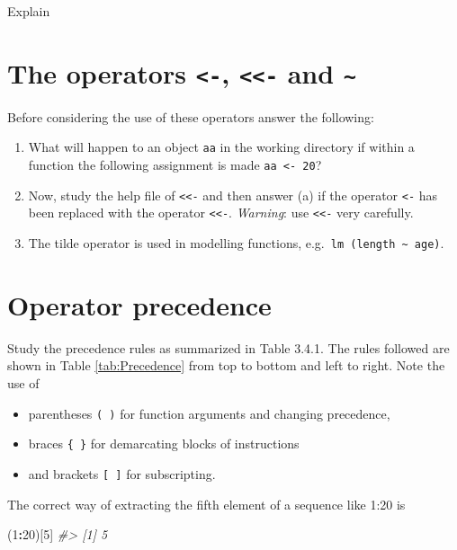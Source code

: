 \documentclass[
]{book}
\newenvironment{Shaded}{\begin{snugshade}}{\end{snugshade}}
\newcommand{\CommentTok}[1]{\textcolor[rgb]{0.56,0.35,0.01}{\textit{#1}}}
\newcommand{\DecValTok}[1]{\textcolor[rgb]{0.00,0.00,0.81}{#1}}
\newcommand{\NormalTok}[1]{#1}
\newcommand{\SpecialCharTok}[1]{\textcolor[rgb]{0.81,0.36,0.00}{\textbf{#1}}}
\providecommand{\tightlist}{%
  \setlength{\itemsep}{0pt}\setlength{\parskip}{0pt}}
\begin{document}
Explain

\section{\texorpdfstring{The operators \texttt{\textless{}-}, \texttt{\textless{}\textless{}-} and \texttt{\textasciitilde{}}}{The operators \textless-, \textless\textless- and \textasciitilde{}}}\label{the-operators-----and}

Before considering the use of these operators answer the following:

\begin{enumerate}
\def\labelenumi{(\alph{enumi})}
\item
  What will happen to an object \texttt{aa} in the working directory if within a function the following assignment is made \texttt{aa\ \textless{}-\ 20}?
\item
  Now, study the help file of \texttt{\textless{}\textless{}-} and then answer (a) if the operator \texttt{\textless{}-} has been replaced with the operator \texttt{\textless{}\textless{}-}. \emph{{Warning}}: use \texttt{\textless{}\textless{}-} very carefully.
\item
  The tilde operator is used in modelling functions, e.g.~\texttt{lm\ (length\ \textasciitilde{}\ age)}.
\end{enumerate}

\section{Operator precedence}\label{operator-precedence}

Study the precedence rules as summarized in Table 3.4.1. The rules followed are shown in Table \ref{tab:Precedence} from top to bottom and left to right. Note the use of

\begin{itemize}
\tightlist
\item
  parentheses \texttt{(\ )} for function arguments and changing precedence,
\item
  braces \texttt{\{\ \}} for demarcating blocks of instructions
\item
  and brackets \texttt{{[}\ {]}} for subscripting.
\end{itemize}

The correct way of extracting the fifth element of a sequence like 1:20 is

\begin{Shaded}
\begin{Highlighting}[]
\NormalTok{(}\DecValTok{1}\SpecialCharTok{:}\DecValTok{20}\NormalTok{)[}\DecValTok{5}\NormalTok{]}
\CommentTok{\#\textgreater{} [1] 5}
\end{Highlighting}
\end{Shaded}
\end{document}
